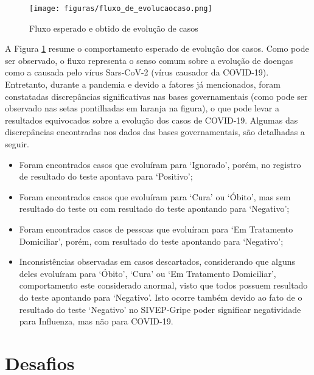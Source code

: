 \begin{figure}[ht]
    \caption{Fluxo esperado e obtido de evolução de casos}
    \centering %
    \texttt{[image: figuras/fluxo\_de\_evolucaocaso.png]}
    \label{figura_evolucao_caso}
\end{figure} %

A Figura \ref{figura_evolucao_caso} resume o comportamento esperado de evolução dos casos. 
Como pode ser observado, o fluxo representa o senso comum sobre a evolução de doenças como a causada pelo vírus Sars-CoV-2 (vírus causador da COVID-19). 
Entretanto, durante a pandemia e devido a fatores já mencionados, foram constatadas discrepâncias significativas nas bases governamentais (como pode ser observado nas setas pontilhadas em laranja na figura), o que pode levar a resultados equivocados sobre a evolução dos casos de COVID-19. Algumas das discrepâncias encontradas nos dados das bases governamentais, são detalhadas a seguir.

\begin{itemize}

       \item Foram encontrados casos que evoluíram para `Ignorado', porém, no registro de resultado do teste apontava para `Positivo';
        \item Foram encontrados casos que evoluíram para `Cura' ou `Óbito', mas sem resultado do teste ou com resultado do teste apontando para `Negativo';
        \item Foram encontrados casos de pessoas que evoluíram para `Em Tratamento Domiciliar', porém, com resultado do teste apontando para `Negativo';
        \item Inconsistências observadas em casos descartados, considerando que alguns deles evoluíram para `Óbito', `Cura' ou `Em Tratamento Domiciliar', comportamento este considerado anormal, visto que todos possuem resultado do teste apontando para `Negativo'. Isto ocorre também devido ao fato de o resultado do teste `Negativo' no SIVEP-Gripe poder significar negatividade para Influenza, mas não para COVID-19.
        
\end{itemize}

\section{Desafios}
 
